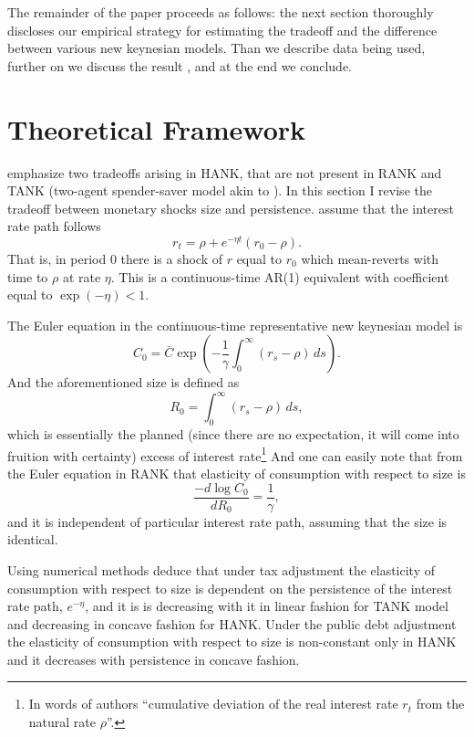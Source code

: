 \documentclass[12pt]{article}
\numberwithin{equation}{section}
\begin{document}
The remainder of the paper proceeds as follows: 
the next section thoroughly discloses our empirical strategy for estimating the tradeoff and the difference between various new keynesian models.
Than we describe data being used, further on we discuss the result , and at the end we conclude.

\section{Theoretical Framework}

\citet{KMV2018} emphasize two tradeoffs arising in HANK, that are not present in RANK and TANK (two-agent spender-saver model akin to \citet{Campbell1989}). In this section I revise the tradeoff between monetary shocks size and persistence. \citet{KMV2018} assume that the interest rate path follows 
\begin{equation}
    r_t=\rho+e^{-\eta t}(r_0-\rho).\label{eq:InterestRatePath}
\end{equation}
That is, in period $0$ there is a shock of $r$ equal to $r_0$ which mean-reverts with time to $\rho$ at rate $\eta$. This is a continuous-time AR(1) equivalent with coefficient equal to $\exp(-\eta)<1$.

The Euler equation in the continuous-time representative new keynesian model is 
\[C_0=\bar C\exp\left(-\frac{1}{\gamma}\int_0^\infty \left(r_s-\rho\right)\,ds\right).\]
And the aforementioned size is defined as 
\begin{equation}
    R_0=\int_0^\infty \left(r_s-\rho\right)\,ds,\label{eq:KMVsize}
\end{equation}
which is essentially the planned (since there are no expectation, it will come into fruition with certainty) excess of interest rate\footnote{In words of authors ``cumulative deviation of the real interest rate $r_t$ from the natural rate $\rho$''.} And one can easily note that from the Euler equation in RANK that elasticity of consumption with respect to size is 
\[\frac{-d \log C_0}{dR_0}=\frac{1}{\gamma},\]
and it is independent of particular interest rate path, assuming that the size is identical. 

Using numerical methods \citet{KMV2018} deduce that under tax adjustment the elasticity of consumption with respect to size is dependent on the persistence of the interest rate path, $e^{-\eta}$, and it is is decreasing with it in linear fashion for TANK model and decreasing in concave fashion for HANK. Under the public debt adjustment the elasticity of consumption with respect to size is non-constant only in HANK and it decreases with persistence in concave fashion.
\end{document}
